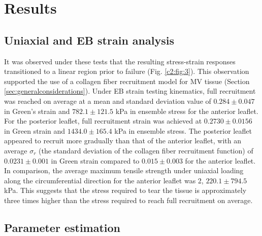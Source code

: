 \section{Results}

\subsection{Uniaxial and EB strain analysis} \label{c2:sec:uniaxialandEBresults}

    It was observed under these tests that the resulting stress-strain responses transitioned to a linear region prior to failure (Fig. \ref{c2:fig:3}). This observation supported the use of a collagen fiber recruitment model for MV tissue (Section \ref{sec:generalconsiderations}). Under EB strain testing kinematics, full recruitment was reached on average at a mean and standard deviation value of $0.284\pm0.047$ in Green’s strain and $782.1\pm121.5$ kPa in ensemble stress for the anterior leaflet. For the posterior leaflet, full recruitment strain was achieved at $0.2730\pm0.0156$ in Green strain and $1434.0\pm165.4$ kPa in ensemble stress. The posterior leaflet appeared to recruit more gradually than that of the anterior leaflet, with an average $\sigma_r$ (the standard deviation of the collagen fiber recruitment function) of $0.0231\pm0.001$ in Green strain compared to $0.015\pm0.003$ for the anterior leaflet. In comparison, the average maximum tensile strength under uniaxial loading along the circumferential direction for the anterior leaflet was 2, $220.1\pm794.5$ kPa. This suggests that the stress required to tear the tissue is approximately three times higher than the stress required to reach full recruitment on average.
    

\subsection{Parameter estimation}

